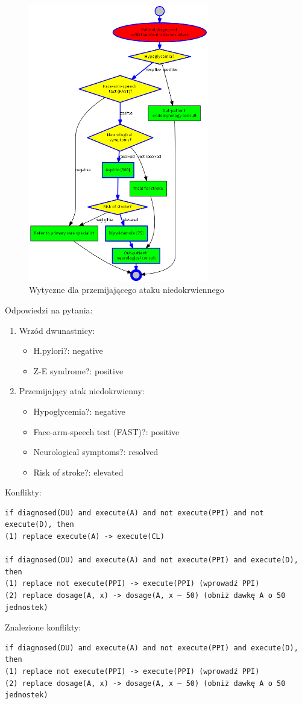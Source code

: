 \begin{figure}[H]
\centering
\includegraphics[width=0.7\textwidth]{img/tia.png}
\caption{Wytyczne dla przemijającego ataku niedokrwiennego}
\label{fig:tia}
\end{figure}
\newpage
\noindent Odpowiedzi na pytania:
\begin{enumerate}
\item{Wrzód dwunastnicy:
	\begin{itemize}
	\item{H.pylori?: negative}
	\item{Z-E syndrome?: positive}
	\end{itemize}
}
\item{Przemijający atak niedokrwienny:
	\begin{itemize}
	\item{Hypoglycemia?: negative}
	\item{Face-arm-speech test (FAST)?: positive}
	\item{Neurological symptoms?: resolved}
	\item{Risk of stroke?: elevated}
	\end{itemize}
}
\end{enumerate}
Konflikty:
\begin{verbatim}
if diagnosed(DU) and execute(A) and not execute(PPI) and not execute(D), then 
(1) replace execute(A) -> execute(CL)

if diagnosed(DU) and execute(A) and not execute(PPI) and execute(D), then
(1) replace not execute(PPI) -> execute(PPI) (wprowadź PPI)
(2) replace dosage(A, x) -> dosage(A, x – 50) (obniż dawkę A o 50 jednostek)
\end{verbatim}
Znalezione konflikty:
\begin{verbatim}
if diagnosed(DU) and execute(A) and not execute(PPI) and execute(D), then
(1) replace not execute(PPI) -> execute(PPI) (wprowadź PPI)
(2) replace dosage(A, x) -> dosage(A, x – 50) (obniż dawkę A o 50 jednostek)
\end{verbatim}
